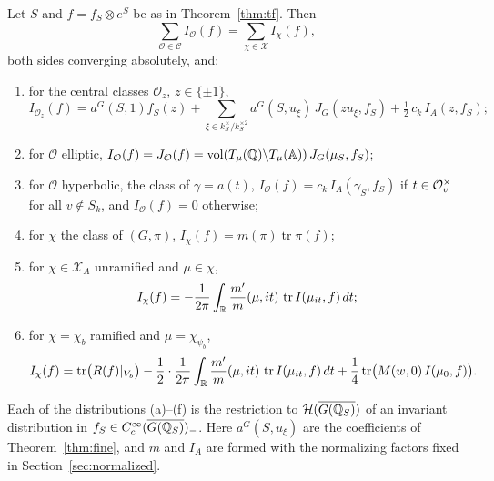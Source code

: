 \begin{theorem}\label{thm:itf}
Let $S$ and $f=f_S\otimes e^S$ be as in Theorem~\ref{thm:tf}. Then
\[
\sum_{\mathcal O\in\mathcal C}I_{\mathcal O}(f)=\sum_{\chi\in\mathcal X}
I_\chi(f),
\]
both sides converging absolutely, and:
\begin{enumerate}[label=(\alph*)]
\item for the central classes $\mathcal O_z$, $z\in\{\pm1\}$,
  \[
  I_{\mathcal O_z}(f)=a^G(S,1)f_S(z)+\sum_{\xi\in k_S^\times/k_S^{\times2}}
  a^G(S,u_\xi)\,J_G(zu_\xi,f_S)+\tfrac12\,c_k\,I_A(z,f_S);
  \]
\item for $\mathcal O$ elliptic, $I_{\mathcal O}(f)=J_{\mathcal O}(f)=
  \operatorname{vol}(T_\mu(\mathbb{Q})\backslash T_\mu(\mathbb{A}))\,J_G(\mu_S,f_S)$;
\item for $\mathcal O$ hyperbolic, the class of $\gamma=a(t)$,
  $I_{\mathcal O}(f)=c_k\,I_A(\gamma_S,f_S)$ if $t\in\mathcal{O}_v^\times$ for all
  $v\notin S_k$, and $I_{\mathcal O}(f)=0$ otherwise;
\item for $\chi$ the class of $(G,\pi)$, $I_\chi(f)=m(\pi)\operatorname{tr}
  \pi(f)$;
\item for $\chi\in\mathcal X_A$ unramified and $\mu\in\chi$,
  \[
  I_\chi(f)=-\frac1{2\pi}\int_{\mathbb{R}}\frac{m'}m(\mu,it)\,\operatorname{tr}
  I(\mu_{it},f)\,dt;
  \]
\item for $\chi=\chi_b$ ramified and $\mu=\chi_{\psi_b}$,
  \[
  I_\chi(f)=\operatorname{tr}\bigl(R(f)|_{V_b}\bigr)-\frac12\cdot\frac1{2\pi}
  \int_{\mathbb{R}}\frac{m'}m(\mu,it)\,\operatorname{tr}I(\mu_{it},f)\,dt
  +\frac14\operatorname{tr}\bigl(M(w,0)\,I(\mu_0,f)\bigr).
  \]
\end{enumerate}
Each of the distributions (a)--(f) is the restriction to $\mathcal H(\overline{G(\mathbb{Q}_S)})$
of an invariant distribution in $f_S\in C_c^\infty(\overline{G(\mathbb{Q}_S)})_-$. Here
$a^G(S,u_\xi)$ are the coefficients of Theorem~\ref{thm:fine}, and $m$ and
$I_A$ are formed with the normalizing factors fixed in
Section~\ref{sec:normalized}.
\end{theorem}

